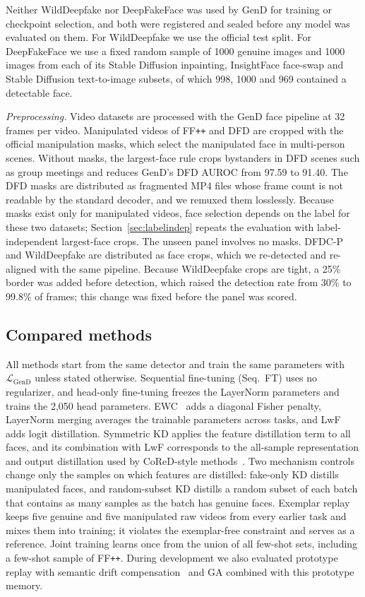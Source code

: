 \documentclass[journal]{IEEEtran}
\newcommand{\ffpp}{FF\texttt{++}}
\begin{document}
Neither WildDeepfake nor DeepFakeFace was used by GenD for training or checkpoint selection, and both were registered and sealed before any model was evaluated on them. For WildDeepfake we use the official test split. For DeepFakeFace we use a fixed random sample of 1000 genuine images and 1000 images from each of its Stable Diffusion inpainting, InsightFace face-swap and Stable Diffusion text-to-image subsets, of which 998, 1000 and 969 contained a detectable face.

\textit{Preprocessing.} Video datasets are processed with the GenD face pipeline at 32 frames per video. Manipulated videos of \ffpp{} and DFD are cropped with the official manipulation masks, which select the manipulated face in multi-person scenes. Without masks, the largest-face rule crops bystanders in DFD scenes such as group meetings and reduces GenD's DFD AUROC from 97.59 to 91.40. The DFD masks are distributed as fragmented MP4 files whose frame count is not readable by the standard decoder, and we remuxed them losslessly. Because masks exist only for manipulated videos, face selection depends on the label for these two datasets; Section~\ref{sec:labelindep} repeats the evaluation with label-independent largest-face crops. The unseen panel involves no masks. DFDC-P and WildDeepfake are distributed as face crops, which we re-detected and re-aligned with the same pipeline. Because WildDeepfake crops are tight, a 25\% border was added before detection, which raised the detection rate from 30\% to 99.8\% of frames; this change was fixed before the panel was scored.

\subsection{Compared methods}
All methods start from the same detector and train the same parameters with $\mathcal{L}_{\mathrm{GenD}}$ unless stated otherwise. Sequential fine-tuning (Seq.\ FT) uses no regularizer, and head-only fine-tuning freezes the LayerNorm parameters and trains the 2{,}050 head parameters. EWC~\cite{kirkpatrick2017ewc} adds a diagonal Fisher penalty, LayerNorm merging averages the trainable parameters across tasks, and LwF~\cite{li2018lwf} adds logit distillation. Symmetric KD applies the feature distillation term to all faces, and its combination with LwF corresponds to the all-sample representation and output distillation used by CoReD-style methods~\cite{kim2021cored}. Two mechanism controls change only the samples on which features are distilled: fake-only KD distills manipulated faces, and random-subset KD distills a random subset of each batch that contains as many samples as the batch has genuine faces. Exemplar replay keeps five genuine and five manipulated raw videos from every earlier task and mixes them into training; it violates the exemplar-free constraint and serves as a reference. Joint training learns once from the union of all few-shot sets, including a few-shot sample of \ffpp{}. During development we also evaluated prototype replay with semantic drift compensation~\cite{yu2020sdc} and GA combined with this prototype memory.
\end{document}
